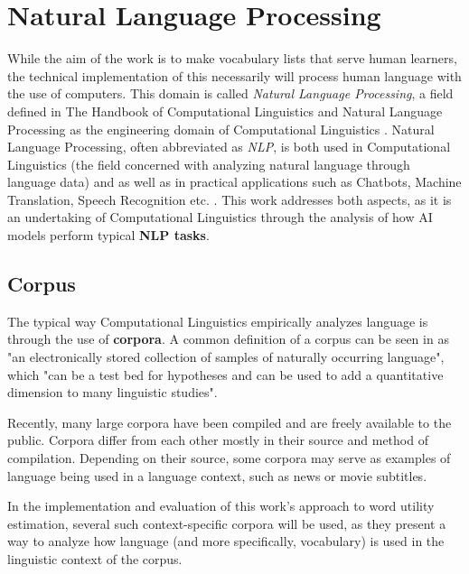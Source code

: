 \section{Natural Language Processing} \label{sec:natural-language-processing}
While the aim of the work is to make vocabulary lists that serve human learners, the technical implementation of this necessarily will process human language with the use of computers.
This domain is called \textit{Natural Language Processing}, a field defined in The Handbook of Computational Linguistics and Natural Language Processing as the engineering domain of Computational Linguistics \cite{alexanderclarkHandbookComputationalLinguistics2010}.
Natural Language Processing, often abbreviated as \textit{NLP}, is both used in Computational Linguistics (the field concerned with analyzing natural language through language data) and as well as in practical applications such as Chatbots, Machine Translation, Speech Recognition etc. \cite{jurafskySpeechLanguageProcessing2025}.
This work addresses both aspects, as it is an undertaking of Computational Linguistics through the analysis of how AI models perform typical \textbf{NLP tasks}.

\subsection{Corpus}
The typical way Computational Linguistics empirically analyzes language is through the use of \textbf{corpora}.
A common definition of a corpus can be seen in \cite{hunstonCorpusLinguistics2006a} as "an electronically stored collection of samples of naturally occurring language", which "can be a test bed for hypotheses and can be used to add a quantitative dimension to many linguistic studies".

Recently, many large corpora have been compiled and are freely available to the public.
Corpora differ from each other mostly in their source and method of compilation.
Depending on their source, some corpora may serve as examples of language being used in a language context, such as news or movie subtitles.

In the implementation and evaluation of this work's approach to word utility estimation, several such context-specific corpora will be used, as they present a way to analyze how language (and more specifically, vocabulary) is used in the linguistic context of the corpus.

